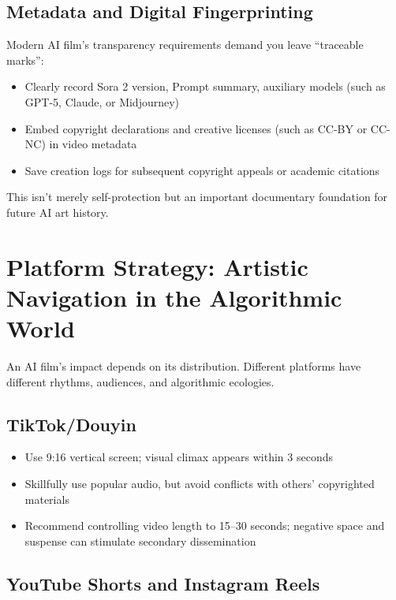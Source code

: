 \subsection{Metadata and Digital Fingerprinting}

Modern AI film's transparency requirements demand you leave ``traceable marks'':

\begin{itemize}
\item Clearly record Sora 2 version, Prompt summary, auxiliary models (such as GPT-5, Claude, or Midjourney)
\item Embed copyright declarations and creative licenses (such as CC-BY or CC-NC) in video metadata
\item Save creation logs for subsequent copyright appeals or academic citations
\end{itemize}

This isn't merely self-protection but an important documentary foundation for future AI art history.

\section{Platform Strategy: Artistic Navigation in the Algorithmic World}
\label{sec:platform-strategy}

An AI film's impact depends on its distribution. Different platforms have different rhythms, audiences, and algorithmic ecologies.

\subsection{TikTok/Douyin}

\begin{itemize}
\item Use 9:16 vertical screen; visual climax appears within 3 seconds
\item Skillfully use popular audio, but avoid conflicts with others' copyrighted materials
\item Recommend controlling video length to 15--30 seconds; negative space and suspense can stimulate secondary dissemination
\end{itemize}

\subsection{YouTube Shorts and Instagram Reels}

